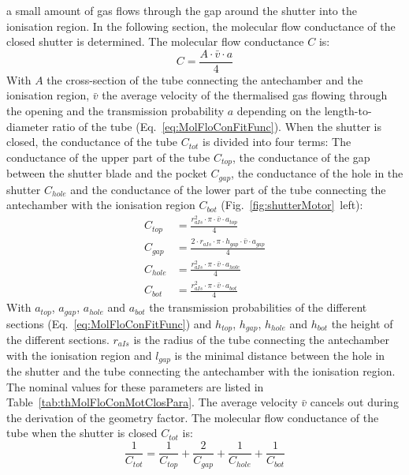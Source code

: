 	a small amount of gas flows through the gap around the shutter into the ionisation region. In the following section, the molecular flow conductance of the closed shutter is determined. The molecular flow conductance $C$ is:
	\begin{equation}
		C = \frac{A\cdot\bar{v}\cdot a}{4}
	\end{equation}
	With $A$ the cross-section of the tube connecting the antechamber and the ionisation region, $\bar{v}$ the average velocity of the thermalised gas flowing through the opening and the transmission probability $a$ depending on the length-to-diameter ratio of the tube (Eq.~\eqref{eq:MolFloConFitFunc}). When the shutter is closed, the conductance of the tube $C_{tot}$ is divided into four terms: The conductance of the upper part of the tube $C_{top}$, the conductance of the gap between the shutter blade and the pocket $C_{gap}$, the conductance of the hole in the shutter $C_{hole}$ and the conductance of the lower part of the tube connecting the antechamber with the ionisation region $C_{bot}$ (Fig.~\ref{fig:shutterMotor}~left):
	\begin{align}
		C_{top}  &= \frac{r_{aIs}^2\cdot\pi\cdot\bar{v}\cdot a_{top}}{4}\\
		C_{gap}  &= \frac{2\cdot r_{aIs}\cdot \pi \cdot h_{gap}\cdot\bar{v}\cdot a_{gap}}{4}\\
		C_{hole} &= \frac{r_{aIs}^2\cdot\pi\cdot\bar{v}\cdot a_{hole}}{4}\\
		C_{bot}  &= \frac{r_{aIs}^2\cdot\pi\cdot\bar{v}\cdot a_{bot}}{4}
	\end{align}
	With $a_{top}$, $a_{gap}$, $a_{hole}$ and $a_{bot}$ the transmission probabilities of the different sections (Eq.~\eqref{eq:MolFloConFitFunc}) and $h_{top}$, $h_{gap}$, $h_{hole}$ and $h_{bot}$ the height of the different sections. $r_{aIs}$ is the radius of the tube connecting the antechamber with the ionisation region and $l_{gap}$ is the minimal distance between the hole in the shutter and the tube connecting the antechamber with the ionisation region. The nominal values for these parameters are listed in Table~\ref{tab:thMolFloConMotClosPara}. The average velocity $\bar{v}$ cancels out during the derivation of the geometry factor. The molecular flow conductance of the tube when the shutter is closed $C_{tot}$ is:
	\begin{equation}
		\frac{1}{C_{tot}} = \frac{1}{C_{top}} + \frac{2}{C_{gap}} + \frac{1}{C_{hole}} + \frac{1}{C_{bot}}
	\end{equation}
